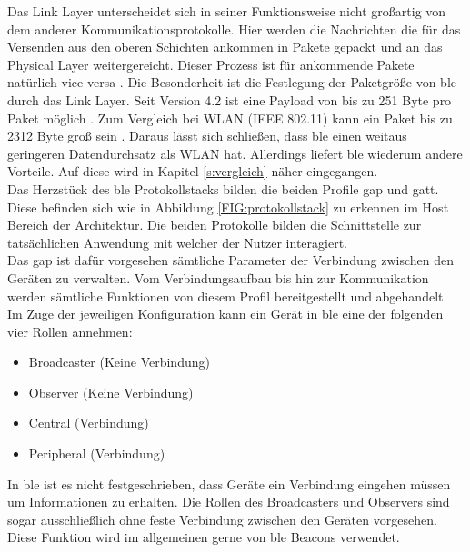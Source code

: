 \noindent Das Link Layer unterscheidet sich in seiner Funktionsweise nicht großartig von dem anderer Kommunikationsprotokolle. Hier werden die Nachrichten die für das  Versenden aus den oberen Schichten ankommen in Pakete gepackt und an das Physical Layer weitergereicht. Dieser Prozess ist für ankommende Pakete natürlich vice versa \cite[Seit 194]{Tanenbaum14:CN}. Die Besonderheit ist die Festlegung der Paketgröße von \ac{ble} durch das Link Layer. Seit Version 4.2 ist eine Payload von bis zu 251 Byte pro Paket möglich \cite{Gupta:WWW}. Zum Vergleich bei WLAN (IEEE 802.11) kann ein Paket bis zu 2312 Byte groß sein \cite[Seite 233]{Gessler15:WNN}. Daraus lässt sich schließen, dass \ac{ble} einen weitaus geringeren Datendurchsatz als WLAN hat. Allerdings liefert \ac{ble} wiederum andere Vorteile. Auf diese wird in Kapitel \ref{s:vergleich} näher eingegangen.\\

\noindent Das Herzstück des \ac{ble} Protokollstacks bilden die beiden Profile \ac{gap} und \ac{gatt}. Diese befinden sich wie in Abbildung \ref{FIG:protokollstack} zu erkennen im Host Bereich der Architektur. Die beiden Protokolle bilden die Schnittstelle zur tatsächlichen Anwendung mit welcher der Nutzer interagiert.\\

\noindent Das \ac{gap} ist dafür vorgesehen sämtliche Parameter der Verbindung zwischen den Geräten zu verwalten. Vom Verbindungsaufbau bis hin zur Kommunikation werden sämtliche Funktionen von diesem Profil bereitgestellt und abgehandelt.\\

\noindent Im Zuge der jeweiligen Konfiguration kann ein Gerät in \ac{ble} eine der folgenden vier Rollen annehmen:
\begin{itemize}
	\item{Broadcaster (Keine Verbindung)}
	\item{Observer (Keine Verbindung)}
	\item{Central (Verbindung)}
	\item{Peripheral (Verbindung)}
\end{itemize}   

\noindent In \ac{ble} ist es nicht festgeschrieben, dass Geräte ein Verbindung eingehen müssen um Informationen zu erhalten. Die Rollen des Broadcasters und Observers sind sogar ausschließlich ohne feste Verbindung zwischen den Geräten vorgesehen. Diese Funktion wird im allgemeinen gerne von \ac{ble} Beacons verwendet.\\

